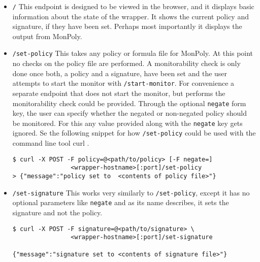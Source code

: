 \begin{itemize}
    \item \texttt{/}
    This endpoint is designed to be viewed in the browser, and it displays basic information about the state of the wrapper.
    It shows the current policy and signature, if they have been set.
    Perhaps most importantly it displays the output from MonPoly.

    \item \texttt{/set-policy}
    This takes any policy or formula file for MonPoly.
    At this point no checks on the policy file are performed.
    A monitorability check is only done once both, a policy and a signature, have been set and the user attempts to start the monitor with \texttt{/start-monitor}.
    For convenience a separate endpoint that does not start the monitor, but performs the monitorability check could be provided.
    Through the optional \texttt{negate} form key, the user can specify whether the negated or non-negated policy should be monitored.
    For this any value provided along with the \texttt{negate} key gets ignored.
    Se the following snippet for how \texttt{/set-policy} could be used with the command line tool curl \cite{curl}.

    \begin{verbatim}
$ curl -X POST -F policy=@<path/to/policy> [-F negate=]
                <wrapper-hostname>[:port]/set-policy
> {"message":"policy set to  <contents of policy file>"}
    \end{verbatim}

    \item \texttt{/set-signature}
    This works very similarly to \texttt{/set-policy}, except it has no optional parameters like \texttt{negate} and as its name describes, it sets the signature and not the policy.
    \begin{verbatim}
$ curl -X POST -F signature=@<path/to/signature> \
                <wrapper-hostname>[:port]/set-signature

{"message":"signature set to <contents of signature file>"}
    \end{verbatim}


\end{itemize}
